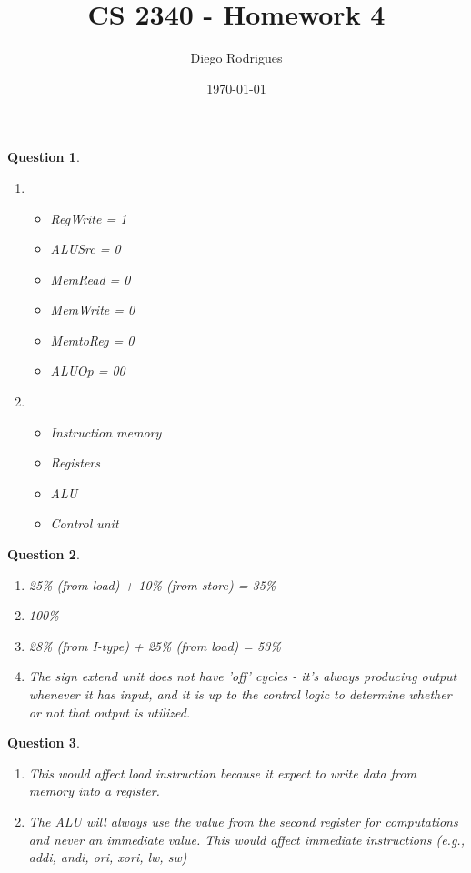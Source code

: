 \documentclass{article}
\author{Diego Rodrigues}
\title{CS 2340 - Homework 4}
\date{\today}
\theoremstyle{questionstyle}
\newtheorem{q}{Question}
\begin{document}
\maketitle

\begin{q}\begin{enumerate} \leavevmode
    \vspace{5mm}
    \item \begin{itemize}
        \item RegWrite = 1
        \item ALUSrc = 0
        \item MemRead = 0
        \item MemWrite = 0
        \item MemtoReg = 0
        \item ALUOp = 00
    \end{itemize}
    \item \begin{itemize}
        \item Instruction memory
        \item Registers
        \item ALU
        \item Control unit
    \end{itemize}
\end{enumerate}\end{q}

\begin{q}\begin{enumerate} \leavevmode
    \item 25\% (from load) + 10\% (from store) = 35\%
    \item 100\%
    \item 28\% (from I-type) + 25\% (from load) = 53\%
    \item The sign extend unit does not have 'off' cycles - it's always producing output whenever it has input, and it is up to the control logic to determine whether or not that output is utilized.
\end{enumerate}\end{q}

\begin{q}\begin{enumerate} \leavevmode
    \item This would affect load instruction because it expect to write data from memory into a register.
    \item  The ALU will always use the value from the second register for computations and never an immediate value. This would affect immediate instructions (e.g., addi, andi, ori, xori, lw, sw)
\end{enumerate}\end{q}
\end{document}
